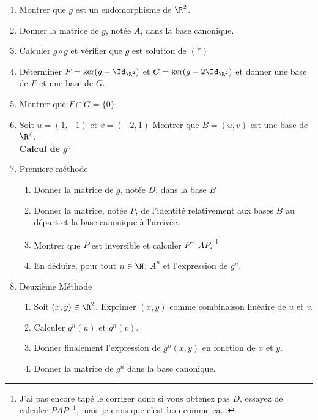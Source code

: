 \documentclass[a4paper, 11pt,reqno]{article}
\begin{document}
\begin{enumerate}

\item Montrer que $g$ est un endomorphisme de $\R^2$.
\item Donner la matrice de $g$, notée $A$,  dans la base canonique. 
\item Calculer $g\circ g$ et vérifier que $g$ est solution de $(*)$
\item Déterminer $F =\ker(g-\Id_{\R^2}) $ et $G =\ker(g- 2\Id_{\R^2}) $ et donner une base de $F$ et une base de $G$. 
\item Montrer que $F \cap G= \{ 0\}$ 
\item Soit $u =(1,-1) $ et  $v= (-2 , 1) $ Montrer que $B=(u,v) $ est une base de $\R^2$.\\
\textbf{Calcul de $g^n$}
\item Premiere méthode \begin{enumerate}
\item Donner la matrice de $g$, notée $D$,  dans la base $B$
\item Donner la matrice, notée $P$, de l'identité relativement aux bases $B$ au départ et la base canonique à l'arrivée. 
\item Montrer que $P$ est inversible et calculer $P^{-1} A P$. \footnote{J'ai pas encore tapé le corriger donc si vous obtenez pas $D$, essayez de calculer $PAP^{-1}$, mais je crois que c'est bon comme ca... }
\item En déduire, pour tout $n\in \N$,  $A^n$ et l'expression de $g^n$.
\end{enumerate} 
\item Deuxième Méthode

\begin{enumerate}
\item Soit $(x,y)\in \R^2$. Exprimer $(x,y) $ comme combinaison linéaire de $u$ et $v$.
\item Calculer $g^n(u)$ et $g^n(v)$. 
\item Donner finalement  l'expression de $g^n(x,y) $ en fonction de $x$ et $y$. 
\item Donner la matrice de $g^n$ dans la base canonique.

\end{enumerate}




\end{enumerate}
\end{document}

